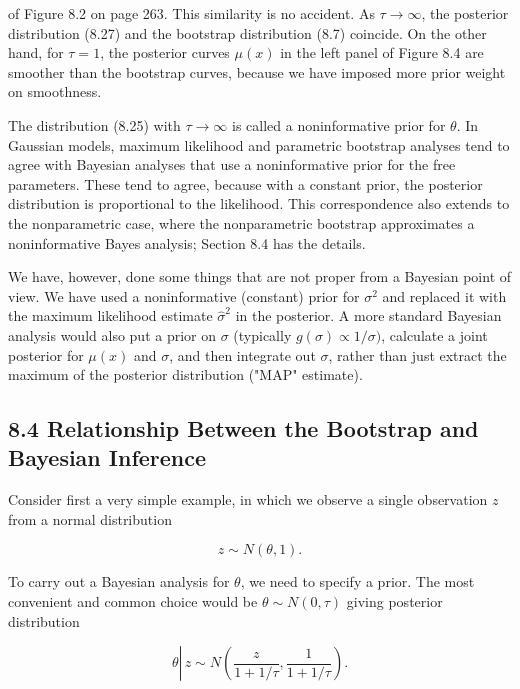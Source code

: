 \documentclass[10pt]{article}
\begin{document}
of Figure 8.2 on page 263. This similarity is no accident. As $\tau \rightarrow \infty$, the posterior distribution (8.27) and the bootstrap distribution (8.7) coincide. On the other hand, for $\tau=1$, the posterior curves $\mu(x)$ in the left panel of Figure 8.4 are smoother than the bootstrap curves, because we have imposed more prior weight on smoothness.

The distribution (8.25) with $\tau \rightarrow \infty$ is called a noninformative prior for $\theta$. In Gaussian models, maximum likelihood and parametric bootstrap analyses tend to agree with Bayesian analyses that use a noninformative prior for the free parameters. These tend to agree, because with a constant prior, the posterior distribution is proportional to the likelihood. This correspondence also extends to the nonparametric case, where the nonparametric bootstrap approximates a noninformative Bayes analysis; Section 8.4 has the details.

We have, however, done some things that are not proper from a Bayesian point of view. We have used a noninformative (constant) prior for $\sigma^{2}$ and replaced it with the maximum likelihood estimate $\hat{\sigma}^{2}$ in the posterior. A more standard Bayesian analysis would also put a prior on $\sigma$ (typically $g(\sigma) \propto 1 / \sigma)$, calculate a joint posterior for $\mu(x)$ and $\sigma$, and then integrate out $\sigma$, rather than just extract the maximum of the posterior distribution ("MAP" estimate).

\subsection*{8.4 Relationship Between the Bootstrap and Bayesian Inference}
Consider first a very simple example, in which we observe a single observation $z$ from a normal distribution


\begin{equation*}
z \sim N(\theta, 1) . \tag{8.29}
\end{equation*}


To carry out a Bayesian analysis for $\theta$, we need to specify a prior. The most convenient and common choice would be $\theta \sim N(0, \tau)$ giving posterior distribution


\begin{equation*}
\theta \left\lvert\, z \sim N\left(\frac{z}{1+1 / \tau}, \frac{1}{1+1 / \tau}\right) .\right. \tag{8.30}
\end{equation*}
\end{document}

